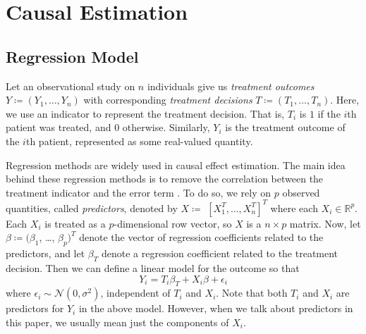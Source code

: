 \documentclass[preprint,12pt]{elsarticle}
\begin{document}
\section{Causal Estimation}\label{sec:causal}

\subsection{Regression Model}

Let an observational study on $n$ individuals give us
\emph{treatment outcomes} $Y\coloneqq(Y_1, \dots, Y_n)$ with 
corresponding \emph{treatment decisions} $T\coloneqq(T_1, \dots, T_n)$.
Here, we use an indicator to represent the treatment decision. That is, $T_i$ is $1$ if the $i$th patient was treated, and $0$ otherwise. Similarly,
$Y_i$ is the treatment outcome of the $i$th patient, represented as some real-valued quantity.

Regression methods are widely used in causal effect estimation. The
main idea behind these regression methods is to remove the
correlation between the treatment indicator and the error term
\citep{winship99,HECKMAN1985}.
To do so, we rely on $p$ observed quantities, called
\emph{predictors}, denoted by $X\coloneqq$ $[X_1^T, \dots, X_n^T]^T$
where each $X_i\in\mathbb{R}^p$.
Each $X_i$ is treated as a $p$-dimensional row vector,
so $X$ is a $n\times p$ matrix.
Now, let
$\beta \coloneqq (\beta_1$, \dots, $\beta_p)^T$ denote the vector of regression
coefficients
related to the predictors, and let $\beta_T$ denote a regression coefficient related to the
treatment decision.
Then we can define a linear model for the outcome
so that
\begin{equation}
	Y_i =  T_i \beta_{T} + X_i\beta + \epsilon_i
\end{equation}
where $\epsilon_i\sim \mathcal{N}(0, \sigma^2)$,
independent of $T_i$ and $X_i$.
Note that both $T_i$ and $X_i$ are predictors for $Y_i$ in the above model.
However, when we talk about predictors in this paper, we usually mean just the components of $X_i$.
\end{document}
